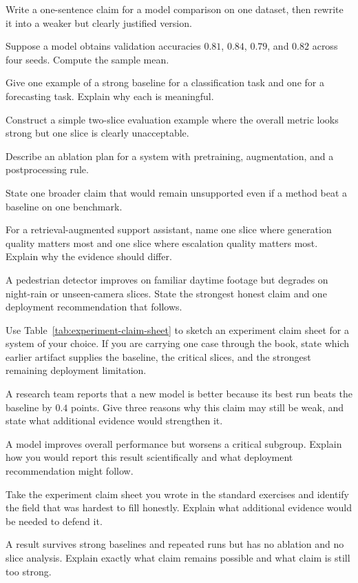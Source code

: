 \begin{exercises}
\item Write a one-sentence claim for a model comparison on one dataset, then rewrite it into a weaker but clearly justified version.
\item Suppose a model obtains validation accuracies $0.81$, $0.84$, $0.79$, and $0.82$ across four seeds. Compute the sample mean.
\item Give one example of a strong baseline for a classification task and one for a forecasting task. Explain why each is meaningful.
\item Construct a simple two-slice evaluation example where the overall metric looks strong but one slice is clearly unacceptable.
\item Describe an ablation plan for a system with pretraining, augmentation, and a postprocessing rule.
\item State one broader claim that would remain unsupported even if a method beat a baseline on one benchmark.
\item For a retrieval-augmented support assistant, name one slice where generation quality matters most and one slice where escalation quality matters most. Explain why the evidence should differ.
\item A pedestrian detector improves on familiar daytime footage but degrades on night-rain or unseen-camera slices. State the strongest honest claim and one deployment recommendation that follows.
\item Use Table~\ref{tab:experiment-claim-sheet} to sketch an experiment claim sheet for a system of your choice. If you are carrying one case through the book, state which earlier artifact supplies the baseline, the critical slices, and the strongest remaining deployment limitation.
\end{exercises}

\begin{challengeexercises}
\item A research team reports that a new model is better because its best run beats the baseline by $0.4$ points. Give three reasons why this claim may still be weak, and state what additional evidence would strengthen it.
\item A model improves overall performance but worsens a critical subgroup. Explain how you would report this result scientifically and what deployment recommendation might follow.
\item Take the experiment claim sheet you wrote in the standard exercises and identify the field that was hardest to fill honestly. Explain what additional evidence would be needed to defend it.
\item A result survives strong baselines and repeated runs but has no ablation and no slice analysis. Explain exactly what claim remains possible and what claim is still too strong.
\end{challengeexercises}
